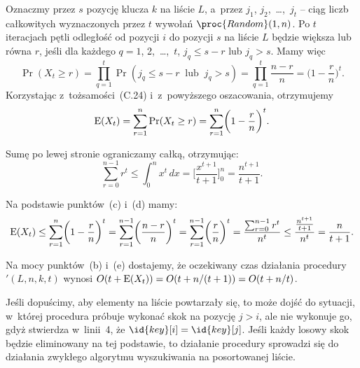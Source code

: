\subproblem %
Oznaczmy przez $s$ pozycję klucza $k$ na liście $L$, a~przez $j_1$, $j_2$,~\dots,~$j_t$ -- ciąg liczb całkowitych wyznaczonych przez $t$ wywołań $\proc{Random}(1,n)$. Po $t$ iteracjach pętli  odległość od pozycji $i$ do pozycji $s$ na liście $L$ będzie większa lub równa $r$, jeśli dla każdego $q=1$, 2,~\dots,~$t$, $j_q\le s-r$ lub $j_q>s$. Mamy więc
\[
	\Pr(X_t\ge r) = \prod_{q=1}^t\Pr(j_q\le s-r\;\;\text{lub}\;\;j_q>s) = \prod_{q=1}^t\frac{n-r}{n} = \biggl(1-\frac{r}{n}\biggr)^t.
\]
Korzystając z~tożsamości~(C.24) i~z~powyższego oszacowania, otrzymujemy
\[
	\operatorname{E}(X_t) = \sum_{r=1}^n\Pr(X_t\ge r) = \sum_{r=1}^n\biggl(1-\frac{r}{n}\biggr)^t.
\]

\subproblem %
Sumę po lewej stronie ograniczamy całką, otrzymując:
\[
	\sum_{r=0}^{n-1}r^t \le \int_0^nx^t\,dx = \biggl[\frac{x^{t+1}}{t+1}\biggr]_0^n = \frac{n^{t+1}}{t+1}.
\]

\subproblem %
Na podstawie punktów~(c) i~(d) mamy:
\[
	\operatorname{E}(X_t) \le \sum_{r=1}^n\biggl(1-\frac{r}{n}\biggr)^t = \sum_{r=1}^{n-1}\biggl(\frac{n-r}{n}\biggr)^t = \sum_{r=1}^{n-1}\biggl(\frac{r}{n}\biggr)^t = \frac{\sum_{r=0}^{n-1}r^t}{n^t} \le \frac{\frac{n^{t+1}}{t+1}}{n^t} = \frac{n}{t+1}.
\]

\subproblem %
Na mocy punktów~(b) i~(e) dostajemy, że oczekiwany czas działania procedury $'(L,n,k,t)$ wynosi $O(t+\operatorname{E}(X_t))=O(t+n/(t+1))=O(t+n/t)$.

\subproblem %

\subproblem %
Jeśli dopuścimy, aby elementy na liście powtarzały się, to może dojść do sytuacji, w~której procedura próbuje wykonać skok na pozycję $j>i$, ale nie wykonuje go, gdyż stwierdza w~linii~4, że $\id{key}[i]=\id{key}[j]$. Jeśli każdy losowy skok będzie eliminowany na tej podstawie, to działanie procedury sprowadzi się do działania zwykłego algorytmu wyszukiwania na posortowanej liście.

\endinput